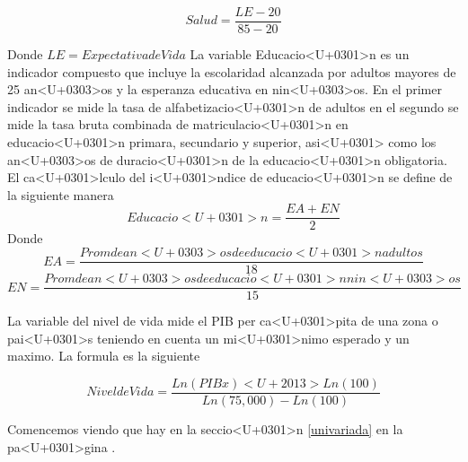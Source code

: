 \documentclass{article}
\begin{document}
\[ Salud=\frac{LE-20} {85-20} \]

Donde $LE = Expectativa de Vida$
La variable Educacio<U+0301>n es un indicador compuesto que incluye la escolaridad alcanzada por adultos mayores de 25 an<U+0303>os y la esperanza educativa en nin<U+0303>os. En el primer indicador se mide la tasa de alfabetizacio<U+0301>n de adultos en el segundo se mide la tasa bruta combinada de matriculacio<U+0301>n en educacio<U+0301>n primara, secundario y superior, asi<U+0301> como los an<U+0303>os de duracio<U+0301>n de la educacio<U+0301>n obligatoria. El ca<U+0301>lculo del i<U+0301>ndice de educacio<U+0301>n se define de la siguiente manera
\[Educacio<U+0301>n= \frac{EA + EN} {2} \]
Donde
\[EA= \frac{Prom de an<U+0303>os de educacio<U+0301>n adultos} {18}  \]
\[EN= \frac{Prom de an<U+0303>os de educacio<U+0301>n nin<U+0303>os} {15}  \]

La variable del nivel de vida mide el PIB per ca<U+0301>pita de una zona o pai<U+0301>s teniendo en cuenta un mi<U+0301>nimo esperado y un maximo. La formula es la siguiente

\[Nivel de Vida = \frac {Ln(PIBx) <U+2013> Ln (100)} {Ln(75,000)-Ln(100)} \]





Comencemos viendo que hay en la seccio<U+0301>n \ref{univariada} en la pa<U+0301>gina \pageref{univariada}.

\clearpage







%
%
\end{document}
